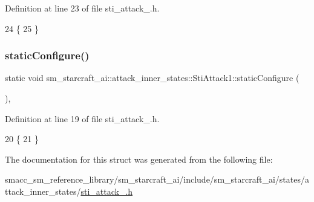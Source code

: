 Definition at line 23 of file sti\+\_\+attack\+\_.\+h.


\begin{DoxyCode}
24   \{
25   \}
\end{DoxyCode}
\mbox{\label{structsm__starcraft__ai_1_1attack__inner__states_1_1StiAttack1_a880c622e62d84a29d09c4c0e7e8f4e69}} 
\subsubsection{\texorpdfstring{static\+Configure()}{staticConfigure()}}
{\footnotesize\ttfamily static void sm\+\_\+starcraft\+\_\+ai\+::attack\+\_\+inner\+\_\+states\+::\+Sti\+Attack1\+::static\+Configure (\begin{DoxyParamCaption}{ }\end{DoxyParamCaption})\hspace{0.3cm}{\ttfamily [inline]}, {\ttfamily [static]}}



Definition at line 19 of file sti\+\_\+attack\+\_.\+h.


\begin{DoxyCode}
20   \{
21   \}
\end{DoxyCode}


The documentation for this struct was generated from the following file\+:\begin{DoxyCompactItemize}
\item 
smacc\+\_\+sm\+\_\+reference\+\_\+library/sm\+\_\+starcraft\+\_\+ai/include/sm\+\_\+starcraft\+\_\+ai/states/attack\+\_\+inner\+\_\+states/\hyperlink{sti__attack__1_8h}{sti\+\_\+attack\+\_.\+h}\end{DoxyCompactItemize}
